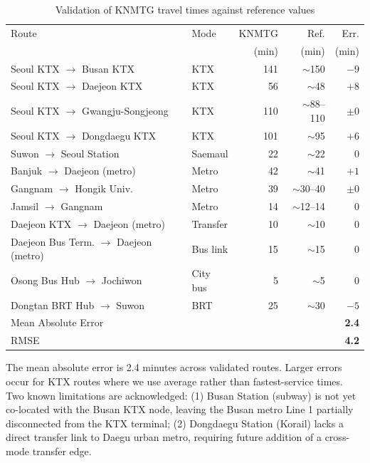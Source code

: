 \documentclass[12pt]{article}
\begin{document}
\begin{table}[h]
\centering
\caption{Validation of KNMTG travel times against reference values}
\label{tab:validation}
\small
\begin{tabular}{p{4.5cm}lrrr}
\toprule
Route & Mode & KNMTG & Ref. & Err. \\
      &      & (min) & (min) & (min) \\
\midrule
Seoul KTX $\to$ Busan KTX & KTX & 141 & $\sim$150 & $-9$ \\
Seoul KTX $\to$ Daejeon KTX & KTX & 56 & $\sim$48 & $+8$ \\
Seoul KTX $\to$ Gwangju-Songjeong & KTX & 110 & $\sim$88--110 & $\pm 0$ \\
Seoul KTX $\to$ Dongdaegu KTX & KTX & 101 & $\sim$95 & $+6$ \\
Suwon $\to$ Seoul Station & Saemaul & 22 & $\sim$22 & $0$ \\
Banjuk $\to$ Daejeon (metro) & Metro & 42 & $\sim$41 & $+1$ \\
Gangnam $\to$ Hongik Univ. & Metro & 39 & $\sim$30--40 & $\pm 0$ \\
Jamsil $\to$ Gangnam & Metro & 14 & $\sim$12--14 & $0$ \\
Daejeon KTX $\to$ Daejeon (metro) & Transfer & 10 & $\sim$10 & $0$ \\
Daejeon Bus Term. $\to$ Daejeon (metro) & Bus link & 15 & $\sim$15 & $0$ \\
Osong Bus Hub $\to$ Jochiwon & City bus & 5 & $\sim$5 & $0$ \\
Dongtan BRT Hub $\to$ Suwon & BRT & 25 & $\sim$30 & $-5$ \\
\midrule
\multicolumn{3}{l}{Mean Absolute Error} & & \textbf{2.4} \\
\multicolumn{3}{l}{RMSE} & & \textbf{4.2} \\
\bottomrule
\end{tabular}
\end{table}

The mean absolute error is 2.4 minutes across validated routes.
Larger errors occur for KTX routes where we use average rather than
fastest-service times. Two known limitations are acknowledged:
(1) Busan Station (subway) is not yet co-located with the Busan KTX
node, leaving the Busan metro Line 1 partially disconnected from
the KTX terminal; (2) Dongdaegu Station (Korail) lacks a direct
transfer link to Daegu urban metro, requiring future addition of a
cross-mode transfer edge.

\end{document}

